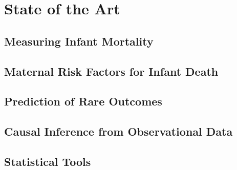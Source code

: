 \chapter{State of the Art}
\label{ch:sota}

\section{Measuring Infant Mortality}

\section{Maternal Risk Factors for Infant Death}

\section{Prediction of Rare Outcomes}

\section{Causal Inference from Observational Data}

\section{Statistical Tools}
